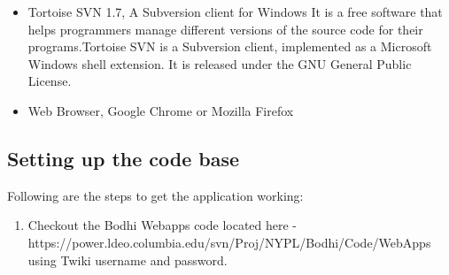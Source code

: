\documentclass[amsart, 12pt]{article}
\begin{document}
\begin{itemize}
\item Tortoise SVN 1.7, A Subversion client for Windows
It is a free software that helps programmers manage different versions of the source code for their programs.Tortoise SVN is a Subversion client, implemented as a Microsoft Windows shell extension. It is released under the GNU General Public License.

\item Web Browser, Google Chrome or Mozilla Firefox
\end{itemize}

\subsection{Setting up the code base}
Following are the steps to get the application working:
\begin{enumerate}
\item Checkout the Bodhi Webapps code located here -\\ https://power.ldeo.columbia.edu/svn/Proj/NYPL/Bodhi/Code/WebApps using Twiki username and password.


\end{enumerate}
\end{document}
